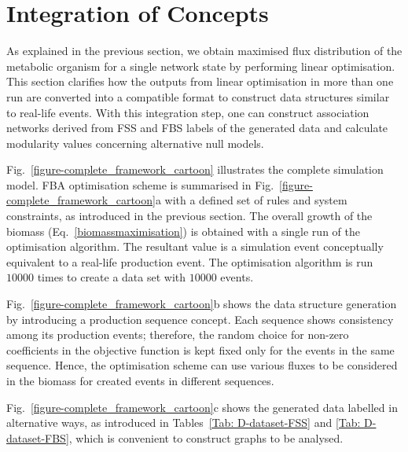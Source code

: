 \section{Integration of Concepts}
As explained in the previous section, we obtain maximised flux distribution of the metabolic organism for a single network state by performing linear optimisation. This section clarifies how the outputs from linear optimisation in more than one run are converted into a compatible format to construct data structures similar to {\color{red} real-life events}. With this integration step, one can construct association networks derived from FSS and FBS labels of the generated data and calculate modularity values concerning alternative null models.



Fig.~\ref{figure-complete_framework_cartoon} illustrates the {\color{red}complete simulation model}. FBA optimisation scheme is summarised in Fig.~\ref{figure-complete_framework_cartoon}a with a defined set of rules and system constraints, as introduced in the previous section. The overall growth of the biomass (Eq.~\eqref{biomassmaximisation}) is obtained with a single run of the optimisation algorithm. The resultant value is a simulation event conceptually equivalent to a {\color{red} real-life production event}. The optimisation algorithm is run $10000$ times to create a data set with $10000$ events. 

Fig.~\ref{figure-complete_framework_cartoon}b shows the data structure generation by introducing a production sequence concept. {\color{red} Each sequence shows consistency among its production events}; therefore, the random choice for non-zero coefficients in the objective function is kept fixed only for the events in the same sequence. Hence, the optimisation scheme can use various fluxes to be considered in the biomass for created events in different sequences. 

Fig.~\ref{figure-complete_framework_cartoon}c shows the generated data labelled in alternative ways, as introduced in Tables~\ref{Tab: D-dataset-FSS} and \ref{Tab: D-dataset-FBS}, which is convenient to construct graphs to be analysed.
